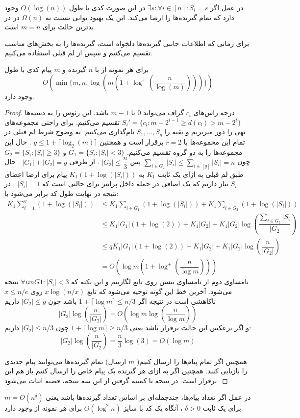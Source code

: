 \begin{remark}
	در عمل اگر 
	$\exists s: \forall i \in [n]: S_i = s$
	در این صورت کدی با طول
	$O(\log(n))$
	وجود دارد که تمام گیرنده‌ها را ارضا می‌کند. این یک بهبود توانی نسبت به
	$\Omega(n)$
	در
	\icod
	در بدترین حالت برای
	$m = n$
	است.
\end{remark}
برای زمانی که اطلاعات جانبی گیرنده‌ها دلخواه است، گیرنده‌ها را به بخش‌های مناسب تقسیم می‌کنیم و سپس از لم قبلی استفاده می‌کنیم.
\begin{theorem}
	برای هر نمونه از
	با
	$n$
	گیرنده و 
	$m$
	پیام کدی با طول
	$$O(\min\{m, n, \log(m(1 + \log^{+}(\dfrac{n}{\log(m)}) ))\})$$
	وجود دارد.
\end{theorem}
\begin{proof}
	درجه راس‌های 
	$c_i$
	گراف می‌تواند
	$0$
	تا
	$m - 1$
	باشد. این رئوس را به دسته‌ها
	$S_{i}' = \{c_l: m - 2^{i - 1} \geq d(c_l) > m -  2^i\}$
	تقسیم می‌کنیم. برای راحتی مجموعه‌های تهی را دور میریزیم و بقیه را
	$S_1, \ldots, S_g$
	نام‌گذاری می‌کنیم. به وضوج شرط لم قبلی در تمام این مجموعه‌ها با
	$r = 2$
	برقرار است و همچنین
	$g \leq 1 + \lceil\log_2(m)\rceil$
	. حال این مجموعه‌ها را به دو گروه تقسیم می‌کنیم.
	$G_1 = \{ S_i: |S_i| < 3\}$
	و 
	$G_2 = \{ S_i: |S_i| \geq 3\}$
	چون
	$\sum_{i \in G_2} |S_i| \leq \sum_{i \in [g]} |S_i| = n$
	پس
	$|G_2| \leq \dfrac{n}{3}$
	. از طرفی
	$|G_1| + |G_2| = g$
	. حال طبق لم قبلی به ازای یک ثابت
	$K_1$
	به
	$K_1(1 + \log(|S_i|))$
	پیام برای ارضا اعضای
	$S_i$
	نیاز داریم که یک اضافی در جمله داخل پرانتز برای حالتی است که
	$|S_i| = 1$
	. در نتیجه در نهایت طول کد برابر می‌شود با:
	\begin{align}
		K_1 \sum\limits_{i = 1}^{g} (1 + \log(|S_i|)) 
		 & \leq K_1 \sum_{i \in G_1}	(1 + \log(|S_i|)) + K_1 \sum_{i \in G_2} (1 + \log(|S_i|)) \\
		& \leq K_1 |G_1| (1 + \log(2)) + K_1 |G_2| + K_1 |G_2| \log(\dfrac{\sum_{i\in G_2} |S_i}{|G_2}) \\
		& \leq q K_1 |G_1| (1 + \log(2)) + K_1 |G_2| + K_1 |G_2| \log(\dfrac{n}{|G_2|}) \\
		& = O(\log m (1 + \log^{+}(\dfrac{n}{\log m})))
	\end{align}
	نامساوی دوم از 
	\hyperref[Jensen]{
	نامساوی ینسن
	}
	روی تابع لگاریتم و این نکته که
	$\forall i in G1: |S_i| < 3$
	نتیجه می‌شود. آخرین خط این گونه توجیه می‌شود که تابع
	$x \log(n/x)$
	روی
	$x \leq n/e$
	ناکاهشی است در نتیجه اگر
	$1 + \lceil \log m \rceil \leq n/3$
	باشد چون
	$|G_2| \leq g$
	داریم
	$$|G_2| \log (\dfrac{n}{|G_2|}) = O(\log m \log (\dfrac{n}{\log m}))$$
	و اگر برعکس این حالت برقرار باشد یعنی
	$1 + \lceil \log m \rceil \ge n/3$
	چون 
	$|G_2| \leq n/3$
	داریم:
	$$|G_2| \log(\dfrac{n}{|G_2}) = \dfrac{n}{3} \log(3) = O(\log m)$$

همچنین اگر تمام پیام‌ها را ارسال کنیم(
$m$
ارسال) تمام گیرنده‌ها می‌توانند پیام جدیدی را بازیابی کنند. همچنین اگر به ازای هر گیرنده یک پیام خاص را ارسال کنیم باز هم این برقرار است. در نتیجه با کمینه گرفتن از این سه نتیجه، قضیه اثبات می‌شود.
\end{proof}
در عمل اگر تعداد پیام‌ها، چندجمله‌ای بر اساس تعداد گیرنده‌ها باشد یعنی
$m = O(n^{\delta})$
برای یک ثابت
$\delta > 0$
، آنگاه یک کد با سایز
$O(\log^2 n)$
برای هر نمونه از
وجود دارد.

